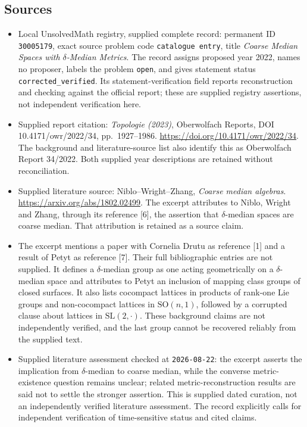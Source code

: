 \documentclass[11pt]{article}
\begin{document}
\subsection{Sources}
\begin{itemize}
\item Local UnsolvedMath registry, supplied complete record: permanent ID \texttt{30005179}, exact source problem code \texttt{catalogue entry}, title \emph{Coarse Median Spaces with $\delta$-Median Metrics}. The record assigns proposed year 2022, names no proposer, labels the problem \texttt{open}, and gives statement status \texttt{corrected\_verified}. Its statement-verification field reports reconstruction and checking against the official report; these are supplied registry assertions, not independent verification here.
\item Supplied report citation: \emph{Topologie (2023)}, Oberwolfach Reports, DOI 10.4171/owr/2022/34, pp.\ 1927--1986. \url{https://doi.org/10.4171/owr/2022/34}. The background and literature-source list also identify this as Oberwolfach Report 34/2022. Both supplied year descriptions are retained without reconciliation.
\item Supplied literature source: Niblo--Wright--Zhang, \emph{Coarse median algebras}. \url{https://arxiv.org/abs/1802.02499}. The excerpt attributes to Niblo, Wright and Zhang, through its reference [6], the assertion that $\delta$-median spaces are coarse median. That attribution is retained as a source claim.
\item The excerpt mentions a paper with Cornelia Drutu as reference [1] and a result of Petyt as reference [7]. Their full bibliographic entries are not supplied. It defines a $\delta$-median group as one acting geometrically on a $\delta$-median space and attributes to Petyt an inclusion of mapping class groups of closed surfaces. It also lists cocompact lattices in products of rank-one Lie groups and non-cocompact lattices in $\mathrm{SO}(n,1)$, followed by a corrupted clause about lattices in $\mathrm{SL}(2,\cdot)$. These background claims are not independently verified, and the last group cannot be recovered reliably from the supplied text.
\item Supplied literature assessment checked at \texttt{2026-08-22}: the excerpt asserts the implication from $\delta$-median to coarse median, while the converse metric-existence question remains unclear; related metric-reconstruction results are said not to settle the stronger assertion. This is supplied dated curation, not an independently verified literature assessment. The record explicitly calls for independent verification of time-sensitive status and cited claims.
\end{itemize}
\end{document}
